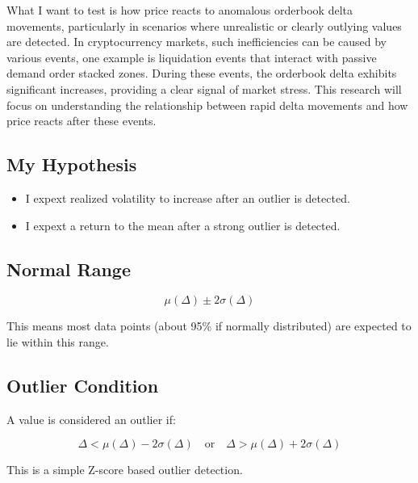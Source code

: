 \documentclass[12pt]{article}
\begin{document}
What I want to test is how price reacts to anomalous orderbook delta movements, particularly in scenarios where unrealistic or clearly outlying values are detected. In cryptocurrency markets, such inefficiencies can be caused by various events, one example is liquidation
 events that interact with passive demand order stacked zones. During these events, the orderbook delta exhibits significant increases, providing a clear signal of market stress. This research will focus on understanding the relationship between rapid delta movements and how price reacts after these events.

\subsection*{My Hypothesis}

\begin{itemize}
  \item I expext realized volatility to increase after an outlier is detected. 
  \item I expext a return to the mean after a strong outlier is detected.
\end{itemize}



\subsection*{Normal Range}





\[
\mu(\Delta) \pm 2\sigma(\Delta)
\]

This means most data points (about 95\% if normally distributed) are expected to lie within this range.

\newpage

\subsection*{Outlier Condition}

A value is considered an outlier if:



\begin{equation}\label{eq: outlier_detection}
  \Delta < \mu(\Delta) - 2\sigma(\Delta) \quad \text{or} \quad \Delta > \mu(\Delta) + 2\sigma(\Delta)    
\end{equation}

This is a simple Z-score based outlier detection.
\end{document}
